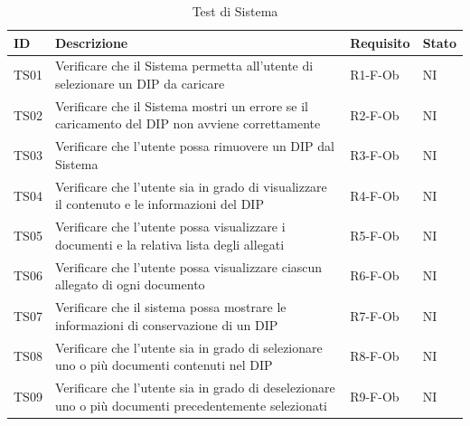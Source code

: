 \documentclass[a4paper,12pt]{article}
\begin{document}
            \begin{longtable}{|M{1.2cm}|M{6.3cm}|M{2.5cm}|M{1.5cm}|}
                
                \caption{Test di Sistema} \\
                \hline
                \textbf{ID} & \textbf{Descrizione} & \textbf{Requisito} & \textbf{Stato} \\
                \hline
                \endhead

                TS01 & Verificare che il Sistema permetta all'utente di selezionare un DIP da caricare& R1-F-Ob & NI \\
                \hline

                TS02 & Verificare che il Sistema mostri un errore se il caricamento del DIP non avviene correttamente & R2-F-Ob & NI \\
                \hline

                TS03 & Verificare che l'utente possa rimuovere un DIP dal Sistema & R3-F-Ob & NI \\
                \hline

                TS04 & Verificare che l'utente sia in grado di visualizzare il contenuto e le informazioni del DIP & R4-F-Ob & NI \\
                \hline

                TS05 & Verificare che l'utente possa visualizzare i documenti e la relativa lista degli allegati & R5-F-Ob & NI \\
                \hline

                TS06 & Verificare che l'utente possa visualizzare ciascun allegato di ogni documento & R6-F-Ob & NI \\
                \hline

                TS07 & Verificare che il sistema possa mostrare le informazioni di conservazione di un DIP & R7-F-Ob & NI \\
                \hline

                TS08 & Verificare che l'utente sia in grado di selezionare uno o più documenti contenuti nel DIP & R8-F-Ob & NI \\
                \hline

                TS09 & Verificare che l'utente sia in grado di deselezionare uno o più documenti precedentemente selezionati & R9-F-Ob & NI \\
                \hline


\end{longtable}
\end{document}
